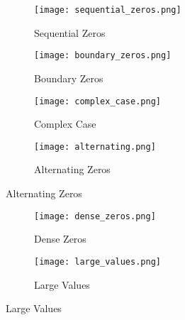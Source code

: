 \begin{figure}[htbp]
    \centering
    \begin{subfigure}[b]{0.45\textwidth}
        \centering
        \texttt{[image: sequential\_zeros.png]}
        \caption{Sequential Zeros}
        \label{fig:sequential_zeros}
    \end{subfigure}
    \hfill
    \begin{subfigure}[b]{0.45\textwidth}
        \centering
        \texttt{[image: boundary\_zeros.png]}
        \caption{Boundary Zeros}
        \label{fig:boundary_zeros}
    \end{subfigure}
    
    \begin{subfigure}[b]{0.45\textwidth}
        \centering
        \texttt{[image: complex\_case.png]}
        \caption{Complex Case}
        \label{fig:complex_case}
    \end{subfigure}
    \hfill
    \begin{subfigure}[b]{0.45\textwidth}
        \centering
        \texttt{[image: alternating.png]}
        \caption{Alternating Zeros}
        \label{fig:alternating_zeros}
    \end{subfigure}
\end{figure}

\begin{figure}[htbp]
    \centering
    \begin{subfigure}[b]{0.45\textwidth}
        \centering
        \texttt{[image: dense\_zeros.png]}
        \caption{Dense Zeros}
        \label{fig:dense_zeros}
    \end{subfigure}
    \hfill
    \begin{subfigure}[b]{0.45\textwidth}
        \centering
        \texttt{[image: large\_values.png]}
        \caption{Large Values}
        \label{fig:large_values}
    \end{subfigure}
\end{figure}
